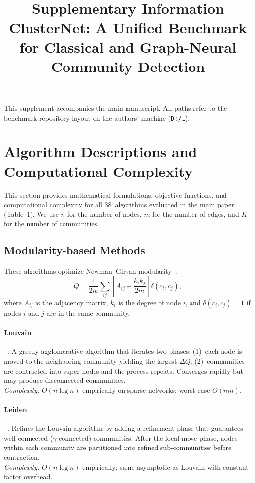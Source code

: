 \documentclass[11pt]{article}
\title{Supplementary Information\\
\large ClusterNet: A Unified Benchmark for Classical and Graph-Neural Community Detection}
\author{}
\date{}
\begin{document}
\maketitle

\noindent This supplement accompanies the main manuscript. All paths refer to the benchmark repository layout on the authors' machine (\texttt{D:/\ldots}).

\section{Algorithm Descriptions and Computational Complexity}
\label{sec:algo_descriptions}

This section provides mathematical formulations, objective functions, and computational complexity for all 38~algorithms evaluated in the main paper (Table~1). We use $n$ for the number of nodes, $m$ for the number of edges, and $K$ for the number of communities.

\subsection{Modularity-based Methods}

These algorithms optimize Newman--Girvan modularity~\citep{m__e__j__newman_cfc12888}:
\[
Q = \frac{1}{2m}\sum_{ij}\left[A_{ij} - \frac{k_i k_j}{2m}\right]\delta(c_i, c_j),
\]
where $A_{ij}$ is the adjacency matrix, $k_i$ is the degree of node $i$, and $\delta(c_i,c_j)=1$ if nodes $i$ and $j$ are in the same community.

\paragraph{Louvain}~\citep{vincent_d__blondel_eead1c1a}.
A greedy agglomerative algorithm that iterates two phases: (1)~each node is moved to the neighboring community yielding the largest $\Delta Q$; (2)~communities are contracted into super-nodes and the process repeats. Converges rapidly but may produce disconnected communities.\\
\emph{Complexity:} $O(n \log n)$ empirically on sparse networks; worst case $O(nm)$.

\paragraph{Leiden}~\citep{traag_leiden_2019}.
Refines the Louvain algorithm by adding a refinement phase that guarantees well-connected ($\gamma$-connected) communities. After the local move phase, nodes within each community are partitioned into refined sub-communities before contraction.\\
\emph{Complexity:} $O(n \log n)$ empirically; same asymptotic as Louvain with constant-factor overhead.
\end{document}
